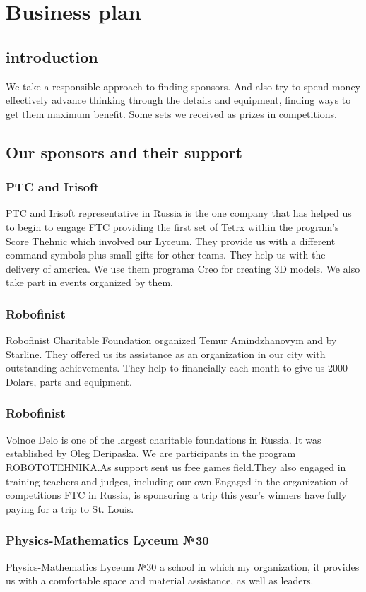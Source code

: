 \section{Business plan}
	\subsection{introduction}
	We take a responsible approach to finding sponsors. And also try to spend money effectively advance thinking through the details and equipment, finding ways to get them maximum benefit. Some sets we received as prizes in competitions.
	
	\subsection{Our sponsors and their support}
		\subsubsection{PTC and Irisoft}
		PTC and Irisoft representative in Russia is the one company that has helped us to begin to engage FTC providing the first set of Tetrx within the program's Score Thehnic which involved our Lyceum. They provide us with a different command symbols plus small gifts for other teams. They help us with the delivery of america. We use them programa Creo for creating 3D models. We also take part in events organized by them.
		\subsubsection{Robofinist}	
		Robofinist Charitable Foundation organized Temur Amindzhanovym and by Starline. They offered us its assistance as an organization in our city with outstanding achievements. They help to financially each month to give us 2000 Dolars, parts and equipment.
		\subsubsection{Robofinist}
		Volnoe Delo is one of the largest charitable foundations in Russia. It was established by Oleg Deripaska. We are participants in the program ROBOTOTEHNIKA.As support sent us free games field.They also engaged in training teachers and judges, including our own.Engaged in the organization of competitions FTC in Russia, is sponsoring a trip this year's winners have fully paying for a trip to St. Louis.	
		\subsubsection{Physics-Mathematics Lyceum №30}
		Physics-Mathematics Lyceum №30 a school in which my organization, it provides us with a comfortable space and material assistance, as well as leaders.
		
